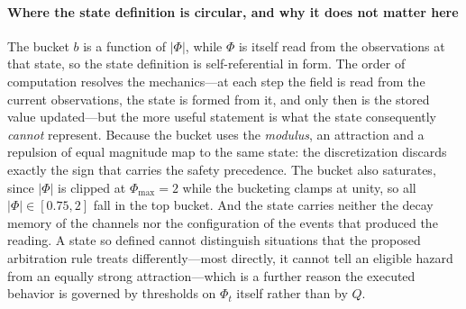 \paragraph*{Where the state definition is circular, and why it does not matter here}
The bucket $b$ is a function of $|\Phi|$, while $\Phi$ is itself read from the
observations at that state, so the state definition is self-referential in form. The
order of computation resolves the mechanics---at each step the field is read from the
current observations, the state is formed from it, and only then is the stored value
updated---but the more useful statement is what the state consequently \emph{cannot}
represent. Because the bucket uses the \emph{modulus}, an attraction and a repulsion
of equal magnitude map to the same state: the discretization discards exactly the
sign that carries the safety precedence. The bucket also saturates, since $|\Phi|$ is
clipped at $\Phi_{\max}=2$ while the bucketing clamps at unity, so all
$|\Phi|\in[0.75,2]$ fall in the top bucket. And the state carries neither the decay
memory of the channels nor the configuration of the events that produced the reading.
A state so defined cannot distinguish situations that the proposed arbitration rule
treats differently---most directly, it cannot tell an eligible hazard from an equally
strong attraction---which is a further reason the executed behavior is governed by
thresholds on $\Phi_t$ itself rather than by $Q$.

